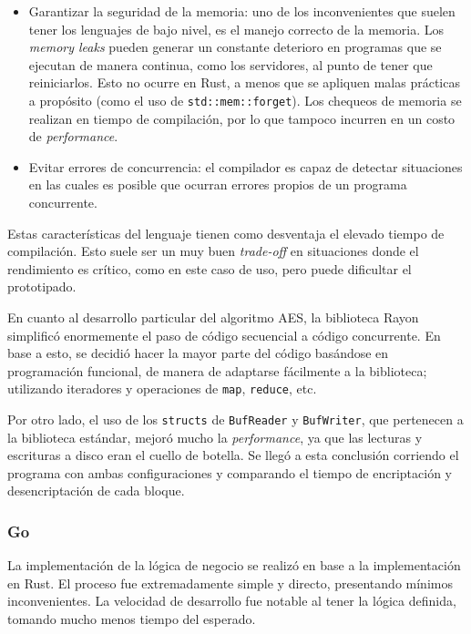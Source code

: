 \documentclass[11pt]{article}
\let\Oldsubsubsection\subsubsection
\renewcommand{\subsubsection}{\FloatBarrier\Oldsubsubsection}
\newcommand{\english}[1]{\textit{#1}}
\begin{document}
\begin{itemize}
    \item Garantizar la seguridad de la memoria: uno de los inconvenientes que suelen tener los lenguajes de bajo nivel, es el manejo correcto de la memoria. Los \english{memory leaks} pueden generar un constante deterioro en programas que se ejecutan de manera continua, como los servidores, al punto de tener que reiniciarlos. Esto no ocurre en Rust, a menos que se apliquen malas prácticas a propósito (como el uso de \lstinline{std::mem::forget}). Los chequeos de memoria se realizan en tiempo de compilación, por lo que tampoco incurren en un costo de \english{performance}.
    
    \item Evitar errores de concurrencia: el compilador es capaz de detectar situaciones en las cuales es posible que ocurran errores propios de un programa concurrente.
    
\end{itemize}

Estas características del lenguaje tienen como desventaja el elevado tiempo de compilación. Esto suele ser un muy buen \english{trade-off} en situaciones donde el rendimiento es crítico, como en este caso de uso, pero puede dificultar el prototipado.

En cuanto al desarrollo particular del algoritmo AES, la biblioteca Rayon simplificó enormemente el paso de código secuencial a código concurrente. En base a esto, se decidió hacer la mayor parte del código basándose en programación funcional, de manera de adaptarse fácilmente a la biblioteca; utilizando iteradores y operaciones de \lstinline{map}, \lstinline{reduce}, etc.

Por otro lado, el uso de los \lstinline{structs} de \lstinline{BufReader} y \lstinline{BufWriter}, que pertenecen a la biblioteca estándar, mejoró mucho la \english{performance}, ya que las lecturas y escrituras a disco eran el cuello de botella. Se llegó a esta conclusión corriendo el programa con ambas configuraciones y comparando el tiempo de encriptación y desencriptación de cada bloque.


\subsubsection{Go}

La implementación de la lógica de negocio se realizó en base a la implementación en Rust. El proceso fue extremadamente simple y directo, presentando mínimos inconvenientes. La velocidad de desarrollo fue notable al tener la lógica definida, tomando mucho menos tiempo del esperado.
\end{document}
